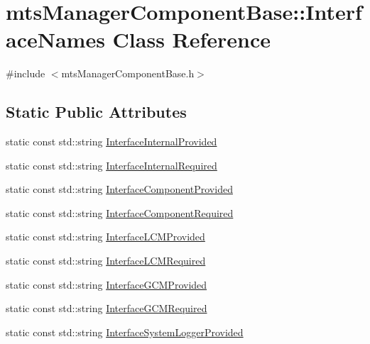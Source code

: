 \hypertarget{classmts_manager_component_base_1_1_interface_names}{}\section{mts\+Manager\+Component\+Base\+:\+:Interface\+Names Class Reference}
\label{classmts_manager_component_base_1_1_interface_names}


{\ttfamily \#include $<$mts\+Manager\+Component\+Base.\+h$>$}

\subsection*{Static Public Attributes}
\begin{DoxyCompactItemize}
\item 
static const std\+::string \hyperlink{classmts_manager_component_base_1_1_interface_names_ab4d18be3e87863dc76b22ba59ef7bf09}{Interface\+Internal\+Provided}
\item 
static const std\+::string \hyperlink{classmts_manager_component_base_1_1_interface_names_a439bf85d1ca10ffe320b0137a20294ba}{Interface\+Internal\+Required}
\item 
static const std\+::string \hyperlink{classmts_manager_component_base_1_1_interface_names_a7a409f1497301d9bbee5d6d0fea401c7}{Interface\+Component\+Provided}
\item 
static const std\+::string \hyperlink{classmts_manager_component_base_1_1_interface_names_a7a33d7dcfd76e820ca863b14b6931b77}{Interface\+Component\+Required}
\item 
static const std\+::string \hyperlink{classmts_manager_component_base_1_1_interface_names_adab745bca44cb20fe2dc8fe1e849bdd9}{Interface\+L\+C\+M\+Provided}
\item 
static const std\+::string \hyperlink{classmts_manager_component_base_1_1_interface_names_a47bbe7357609b36bd957f461bcf79930}{Interface\+L\+C\+M\+Required}
\item 
static const std\+::string \hyperlink{classmts_manager_component_base_1_1_interface_names_a2e6d82fed60eceeea54911f9a9963346}{Interface\+G\+C\+M\+Provided}
\item 
static const std\+::string \hyperlink{classmts_manager_component_base_1_1_interface_names_a15a22d6897fbc59047ae2df0973b9e1a}{Interface\+G\+C\+M\+Required}
\item 
static const std\+::string \hyperlink{classmts_manager_component_base_1_1_interface_names_ad5ed77aeed44addf0fbb46df6c621012}{Interface\+System\+Logger\+Provided}

\end{DoxyCompactItemize}
